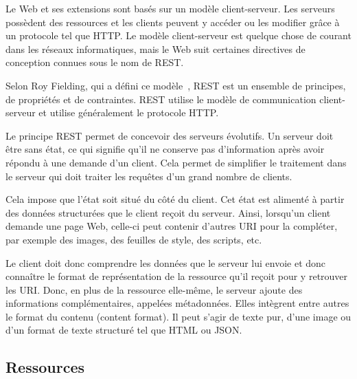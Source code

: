   Le Web et ses extensions sont basés sur un modèle client-serveur. Les serveurs possèdent des ressources et les clients peuvent y accéder ou les modifier grâce à un protocole tel que \ac{HTTP}. Le modèle client-serveur est quelque chose de courant dans les réseaux informatiques, mais le Web suit certaines directives de conception connues sous le nom de \ac{REST}.

    \vspace{1em}

Selon Roy Fielding, qui a défini ce modèle~\cite{rest}, \ac{REST} est un ensemble de principes, de propriétés et de contraintes. \ac{REST} utilise le modèle de communication client-serveur et utilise généralement le protocole \ac{HTTP}.

Le principe \ac{REST} permet de concevoir des serveurs évolutifs. Un serveur doit être sans état, ce qui signifie qu’il ne conserve pas d’information après avoir répondu à une demande d’un client. Cela permet de simplifier le traitement dans le serveur qui doit traiter les requêtes d'un grand nombre de clients. 

Cela impose que l’état soit situé du côté du client. Cet état est alimenté à partir des données structurées que le client reçoit du serveur. Ainsi, lorsqu’un client demande une page Web, celle-ci peut contenir d’autres \ac{URI} pour la compléter, par exemple des images, des feuilles de style, des scripts, etc.

Le client doit donc comprendre les données que le serveur lui envoie et donc connaître le format de représentation de la ressource qu'il reçoit pour y retrouver les \ac{URI}. Donc, en plus de la ressource elle-même, le serveur ajoute des informations complémentaires, appelées métadonnées. Elles intègrent entre autres le format du contenu (content format). Il peut s’agir de texte pur, d’une image ou d’un format de texte structuré tel que \ac{HTML} ou \ac{JSON}.
  
      \vspace{1em}

\subsection{Ressources}

    \vspace{1em}

